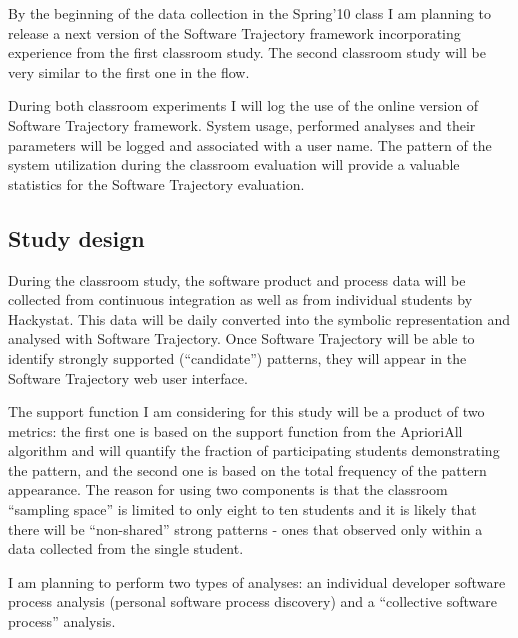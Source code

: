 By the beginning of the data collection in the Spring'10 class I am planning to release a next version of the Software Trajectory framework incorporating experience from the first classroom study. The second classroom study will be very similar to the first one in the flow. 

During both classroom experiments I will log the use of the online version of Software Trajectory framework. System usage, performed analyses and their parameters will be logged and associated with a user name. The pattern of the system utilization during the classroom evaluation will provide a valuable statistics for the Software Trajectory evaluation.

\subsection{Study design}
During the classroom study, the software product and process data will be collected from continuous integration as well as from individual students by Hackystat. This data will be daily converted into the symbolic representation and analysed with Software Trajectory. Once Software Trajectory will be able to identify strongly supported (``candidate'') patterns, they will appear in the Software Trajectory web user interface.

The support function I am considering for this study will be a product of two metrics: the first one is based on the support function from the AprioriAll algorithm and will quantify the fraction of participating students demonstrating the pattern, and the second one is based on the total frequency of the pattern appearance. The reason for using two components is that the classroom ``sampling space'' is limited to only eight to ten students and it is likely that there will be ``non-shared'' strong patterns - ones that observed only within a data collected from the single student.

I am planning to perform two types of analyses: an individual developer software process analysis (personal software process discovery) and a ``collective software process'' analysis.

